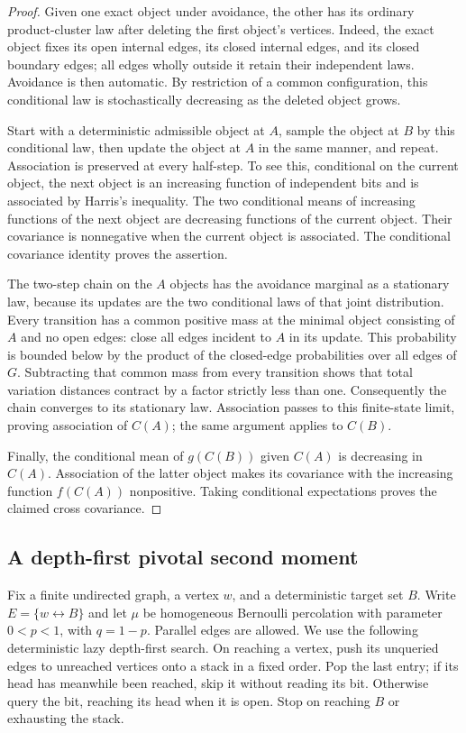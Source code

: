 \begin{proof}
Given one exact object under avoidance, the other has its ordinary
product-cluster law after deleting the first object's vertices.
Indeed, the exact object fixes its open internal edges, its closed
internal edges, and its closed boundary edges; all edges wholly outside
it retain their independent laws. Avoidance is then automatic.
By restriction of a common configuration, this conditional law is
stochastically decreasing as the deleted object grows.

Start with a deterministic admissible object at $A$, sample the object
at $B$ by this conditional law, then update the object at $A$ in the
same manner, and repeat. Association is preserved at every half-step.
To see this, conditional on the current object, the next object is an
increasing function of independent bits and is associated by Harris's
inequality. The two conditional means of increasing functions of the
next object are decreasing functions of the current object. Their
covariance is nonnegative when the current object is associated.
The conditional covariance identity proves the assertion.

The two-step chain on the $A$ objects has the avoidance marginal as
a stationary law, because its updates are the two conditional laws of
that joint distribution. Every transition has a common positive mass
at the minimal object consisting of $A$ and no open edges: close all
edges incident to $A$ in its update. This probability is bounded below
by the product of the closed-edge probabilities over all edges of $G$.
Subtracting that common mass from every transition shows that total
variation distances contract by a factor strictly less than one.
Consequently the chain converges to its stationary law. Association
passes to this finite-state limit, proving association of $C(A)$;
the same argument applies to $C(B)$.

Finally, the conditional mean of $g(C(B))$ given $C(A)$ is decreasing
in $C(A)$. Association of the latter object makes its covariance with
the increasing function $f(C(A))$ nonpositive. Taking conditional
expectations proves the claimed cross covariance.
\end{proof}

\subsection{A depth-first pivotal second moment}

Fix a finite undirected graph, a vertex $w$, and a deterministic target
set $B$. Write $E=\{w\leftrightarrow B\}$ and let $\mu$ be homogeneous
Bernoulli percolation with parameter $0<p<1$, with $q=1-p$.
Parallel edges are allowed. We use the following deterministic lazy
depth-first search. On reaching a vertex, push its unqueried edges to
unreached vertices onto a stack in a fixed order. Pop the last entry;
if its head has meanwhile been reached, skip it without reading its
bit. Otherwise query the bit, reaching its head when it is open.
Stop on reaching $B$ or exhausting the stack.

